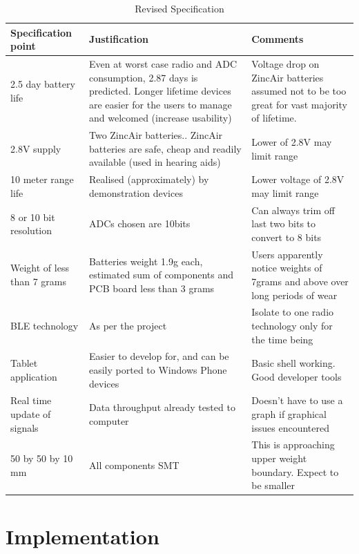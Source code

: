 \documentclass[]{article}
\begin{document}
\begin{table}[H]
\centering
\caption{Revised Specification}
\label{tbl:spec}
\begin{tabular}{|p{1.5in}|p{2.1in}|p{2.1in}|} \hline 
\textbf{Specification point} & \textbf{Justification} & \textbf{Comments} \\ \hline 
2.5 day battery life & Even at worst case radio and \ac{ADC} consumption, 2.87 days is predicted. Longer lifetime devices are easier for the users to manage and welcomed (increase usability) & Voltage drop on ZincAir batteries assumed not to be too great for vast majority of lifetime. \\ \hline  
2.8V supply & Two ZincAir batteries.. ZincAir batteries are safe, cheap and readily available (used in hearing aids) & Lower of 2.8V may limit range\\ \hline  
10 meter range life & Realised (approximately) by demonstration devices  & Lower voltage of 2.8V may limit range\\ \hline  
8 or 10 bit resolution & \ac{ADC}s chosen are 10bits & Can always trim off last two bits to convert to 8 bits\\ \hline  
Weight of less than 7 grams & Batteries weight 1.9g each, estimated sum of components and PCB board less than 3 grams & Users apparently notice weights of 7grams and above over long periods of wear  \\ \hline  
\ac{BLE} technology & As per the project & Isolate to one radio technology only for the time  being\\ \hline  
Tablet application &  Easier to develop for, and can be easily ported to Windows Phone devices & Basic shell working. Good developer tools \\ \hline  
Real time update of signals & Data throughput already tested to computer & Doesn't have to use a graph if graphical issues encountered\\ \hline  
50 by 50 by 10 mm & All components SMT & This is approaching upper weight boundary. Expect to be smaller\\ \hline  



\end{tabular}
\end{table}












\clearpage
\section{Implementation}
\end{document}
